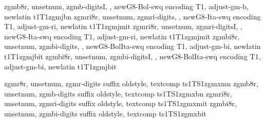{zgmb8r,%
unsetnum,%
zgmb-digitsI,%
\metrics {},%
newG8-Bol-swq encoding T1,%
adjust-gm-b,%
newlatin}
{t1}{T1}{zgmj}{b}{n}{}
%
{zgmri8r,%
unsetnum,%
zgmri-digits,%
\metrics {},%
newG8-Ita-swq encoding T1,%
adjust-gm-ri,%
newlatin}
{t1}{T1}{zgmj}{m}{it}{}
%
{zgmri8r,%
unsetnum,%
zgmri-digitsI,%
\metrics {},%
newG8-Ita-swq encoding T1,%
adjust-gm-ri,%
newlatin}
{t1}{T1}{zgmj}{m}{it}{}
%
{zgmbi8r,%
unsetnum,%
zgmbi-digits,%
\metrics {},%
newG8-BolIta-swq encoding T1,%
adjust-gm-bi,%
newlatin}
{t1}{T1}{zgmj}{b}{it}{}
%
{zgmbi8r,%
unsetnum,%
zgmbi-digitsI,%
\metrics {},%
newG8-BolIta-swq encoding T1,%
adjust-gm-bi,%
newlatin}
{t1}{T1}{zgmj}{b}{it}{}

%
{zgmr8r,%
unsetnum,%
zgmr-digits suffix oldstyle,%
textcomp}
{ts1}{TS1}{zgmx}{m}{n}{}
%
{zgmb8r,%
unsetnum,%
zgmb-digits suffix oldstyle,%
textcomp}
{ts1}{TS1}{zgmx}{b}{n}{}
%
{zgmri8r,%
unsetnum,%
zgmri-digits suffix oldstyle,%
textcomp}
{ts1}{TS1}{zgmx}{m}{it}{}
%
{zgmbi8r,%
unsetnum,%
zgmbi-digits suffix oldstyle,%
textcomp}
{ts1}{TS1}{zgmx}{b}{it}{}


\endinstallfonts
\bye

